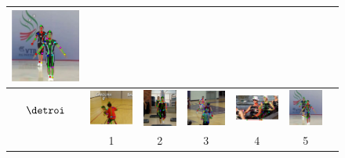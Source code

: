 \begin{figure}
\begin{tabular}{c c c c c c c}
    \includegraphics[height=0.140\linewidth]{imgidx_0630_sticks_mpii_multi.pdf}\\
    \midrule\midrule
    \begin{sideways}\bf \quad\quad$\detroi$\end{sideways}&
    \includegraphics[height=0.140\linewidth]{imgidx_1674_sticks_detroi_mpii_multi.pdf}& 
    \includegraphics[height=0.140\linewidth]{imgidx_0564_sticks_detroi_mpii_multi.pdf}&
    \includegraphics[height=0.140\linewidth]{imgidx_1652_sticks_detroi_mpii_multi.pdf}&
    \includegraphics[height=0.140\linewidth]{imgidx_0472_sticks_detroi_mpii_multi.pdf}&
    \includegraphics[height=0.140\linewidth]{imgidx_0630_sticks_detroi_mpii_multi.pdf}\\
  &1&2&3&4&5\\  
  \end{tabular}


\end{figure}
